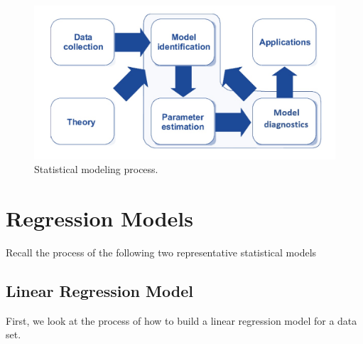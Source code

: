 \documentclass[
]{book}
\begin{document}
\begin{figure}

{\centering \includegraphics[width=0.8\linewidth]{img06/w06-StatModelProcess} 

}

\caption{Statistical modeling process.}\label{fig:unnamed-chunk-117}
\end{figure}

\hypertarget{regression-models}{%
\section{Regression Models}\label{regression-models}}

Recall the process of the following two representative statistical models

\hypertarget{linear-regression-model}{%
\subsection{Linear Regression Model}\label{linear-regression-model}}

First, we look at the process of how to build a linear regression model for a data set.
\end{document}
